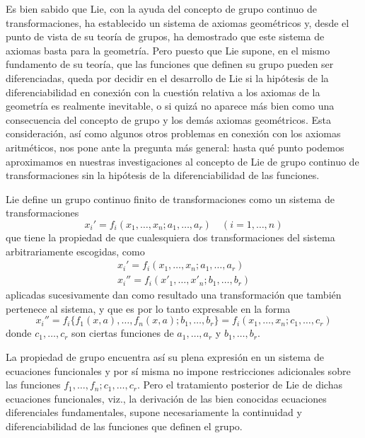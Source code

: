 \documentclass[a4paper, 12pt]{article}
\begin{document}
Es bien sabido que Lie, con la ayuda del concepto de grupo continuo de transformaciones, ha establecido un sistema de axiomas geométricos y, desde el punto de vista de su teoría de grupos, ha demostrado que este sistema de axiomas basta para la geometría. Pero puesto que Lie supone, en el mismo fundamento de su teoría, que las funciones que definen su grupo pueden ser diferenciadas, queda por decidir en el desarrollo de Lie si la hipótesis de la diferenciabilidad en conexión con la cuestión relativa a los axiomas de la geometría es realmente inevitable, o si quizá no aparece más bien como una consecuencia del concepto de grupo y los demás axiomas geométricos. Esta consideración, así como algunos otros problemas en conexión con los axiomas aritméticos, nos pone ante la pregunta más general: hasta qué punto podemos aproximamos en nuestras investigaciones al concepto de Lie de grupo continuo de transformaciones sin la hipótesis de la diferenciabilidad de las funciones. 


Lie define un grupo continuo finito de transformaciones como un sistema de transformaciones 
$$
x_i'=f_i(x_1, \dots,x_n;a_1, \dots, a_r) \quad (i=1, \dots, n)
$$
que tiene la propiedad de que cualesquiera dos transformaciones del sistema arbitrariamente escogidas, como 
\begin{equation}\nonumber
\begin{split}
x_i'=f_i(x_1, \dots,x_n;a_1, \dots, a_r) \\
x_i''=f_i(x'_1, \dots,x'_n;b_1, \dots, b_r) 
\end{split}
\end{equation}
aplicadas sucesivamente dan como resultado una transformación que también pertenece al sistema, y que es por lo tanto expresable en la forma 
$$
x_i''=f_i\{f_1(x,a), \dots, f_n(x,a);b_1, \dots, b_r\}=f_i(x_1, \dots, x_n;c_1, \dots, c_r)
$$
donde  $c_1, \dots, c_r$ son ciertas funciones de $a_1, \dots, a_r$ y $b_1, \dots, b_r$.

 La propiedad de grupo encuentra así su plena expresión en un sistema de ecuaciones funcionales y por sí misma no impone restricciones adicionales sobre las funciones $f_1, \dots, f_n; c_1, \dots, c_r$.
 Pero el tratamiento posterior de Lie de dichas ecuaciones funcionales,   viz., 
   la derivación de las bien conocidas ecuaciones diferenciales fundamentales, supone necesariamente la continuidad y diferenciabilidad de las funciones que definen el grupo. 
   
\end{document}
